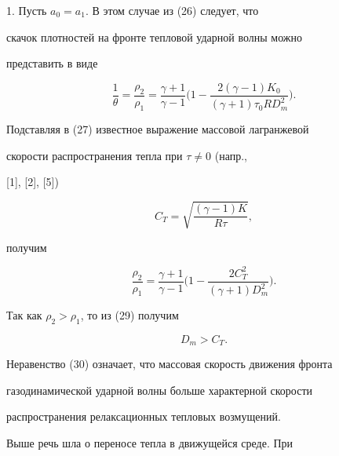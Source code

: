 \medskip





1. Пусть $a_0 = a_1$. В этом случае из (26) следует, что


скачок плотностей на фронте тепловой ударной волны можно


представить в виде


\begin{equation}


\frac {1}{\theta} = \frac {\rho _2} {\rho_1} = \frac {\gamma + 1}


{\gamma - 1} \bigg(1 - \frac {2 (\gamma -1) K_0} {(\gamma + 1) \tau _0 R


D_{m}^2}\bigg).


\end{equation}


Подставляя в (27) известное выражение массовой лагранжевой


скорости распространения тепла при $\tau \neq 0$ (напр.,


[1], [2], [5])


\begin{equation}


C_T = \sqrt{\frac {(\gamma - 1) K} {R\tau}},


\end{equation}


получим


\begin{equation}


\frac {\rho _2}{\rho _1} = \frac {\gamma + 1}


{\gamma - 1} \bigg(1 - \frac {2 C_T ^2}{(\gamma + 1) D _m^2}\bigg).


\end{equation}


Так как $\rho _2 > \rho _1$, то из (29) получим


\begin{equation}


D_{m} > C_T.


\end{equation}


Неравенство (30) означает, что массовая скорость движения фронта


газодинамической ударной волны больше характерной скорости


распространения релаксационных тепловых возмущений.





Выше речь шла о переносе тепла в движущейся среде. При


